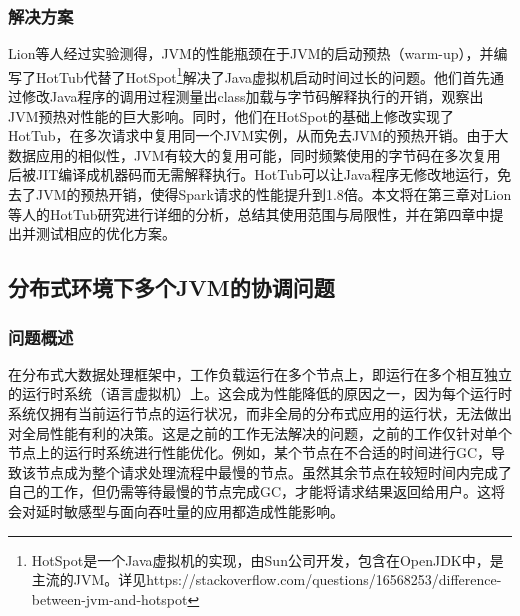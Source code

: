 \documentclass[lang=cn,12pt,a4paper,cite=authoryear]{elegantpaper}
\begin{document}
\subsubsection{解决方案}
Lion等人经过实验测得，JVM的性能瓶颈在于JVM的启动预热（warm-up），并编写了HotTub\cite{DBLP:conf/osdi/LionCSZGY16}代替了HotSpot\footnote{HotSpot是一个Java虚拟机的实现，由Sun公司开发，包含在OpenJDK中，是主流的JVM。详见https://stackoverflow.com/questions/16568253/difference-between-jvm-and-hotspot}解决了Java虚拟机启动时间过长的问题。他们首先通过修改Java程序的调用过程测量出class加载与字节码解释执行的开销，观察出JVM预热对性能的巨大影响。同时，他们在HotSpot的基础上修改实现了HotTub，在多次请求中复用同一个JVM实例，从而免去JVM的预热开销。由于大数据应用的相似性，JVM有较大的复用可能，同时频繁使用的字节码在多次复用后被JIT编译成机器码而无需解释执行。HotTub可以让Java程序无修改地运行，免去了JVM的预热开销，使得Spark请求的性能提升到1.8倍。本文将在第三章对Lion等人的HotTub研究进行详细的分析，总结其使用范围与局限性，并在第四章中提出并测试相应的优化方案。

\subsection{分布式环境下多个JVM的协调问题}
\subsubsection{问题概述}
在分布式大数据处理框架中，工作负载运行在多个节点上，即运行在多个相互独立的运行时系统（语言虚拟机）上。这会成为性能降低的原因之一，因为每个运行时系统仅拥有当前运行节点的运行状况，而非全局的分布式应用的运行状，无法做出对全局性能有利的决策。这是之前的工作无法解决的问题，之前的工作仅针对单个节点上的运行时系统进行性能优化。例如，某个节点在不合适的时间进行GC，导致该节点成为整个请求处理流程中最慢的节点。虽然其余节点在较短时间内完成了自己的工作，但仍需等待最慢的节点完成GC，才能将请求结果返回给用户。这将会对延时敏感型与面向吞吐量的应用都造成性能影响。
\end{document}
